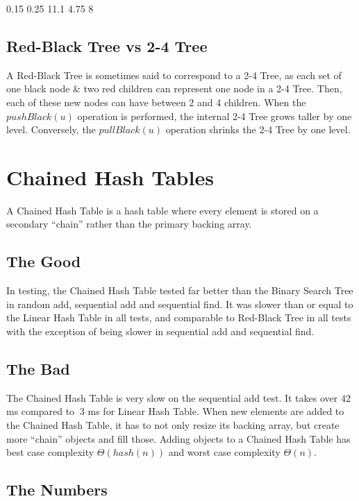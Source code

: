 \documentclass{muformallab}
\begin{document}
   {0.15} {0.25} {11.1} {4.75} {8}

  \subsection{Red-Black Tree vs 2-4 Tree}

  A Red-Black Tree is sometimes said to correspond to a 2-4 Tree, as each
  set of one black node \& two red children can represent one node in
  a 2-4 Tree.  Then, each of these new nodes can have between 2 and
  4 children.  When the $pushBlack(u)$ operation is performed, the
  internal 2-4 Tree grows taller by one level. Conversely, the
  $pullBlack(u)$ operation shrinks the 2-4 Tree by one level.

  \section{Chained Hash Tables}

  A Chained Hash Table is a hash table where every element is stored on
  a secondary ``chain'' rather than the primary backing array.

  \subsection{The Good}

  In testing, the Chained Hash Table tested far better than the Binary
  Search Tree in random add, sequential add and sequential find. It was
  slower than or equal to the Linear Hash Table in all tests, and
  comparable to Red-Black Tree in all tests with the exception of being
  slower in sequential add and sequential find.

  \subsection{The Bad}

  The Chained Hash Table is very slow on the sequential add test. It takes
  over $42$ ms compared to $~3$ ms for Linear Hash Table. When new
  elements are added to the Chained Hash Table, it has to not only resize
  its backing array, but create more ``chain'' objects and fill those.
  Adding objects to a Chained Hash Table has best case complexity $\Theta
  \left( hash \left( n \right) \right)$ and worst case complexity $\Theta
  \left( n \right)$.

  \subsection{The Numbers}
\end{document}
